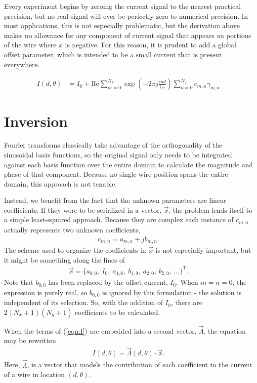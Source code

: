 \documentclass{article}
\def\real{\mathrm{Re}}
\begin{document}
Every experiment begins by zeroing the current signal to the nearest practical precision, but no real signal will ever be perfectly zero to numerical precision.  In most applications, this is not especially problematic, but the derivation above makes no allowance for any component of current signal that appears on portions of the wire where $x$ is negative.  For this reason, it is prudent to add a global offset parameter, which is intended to be a small current that is present everywhere.  

\begin{align}
I(d,\theta) &= I_0 + \real \sum_{m=0}^{N_x} \exp\left(-2\pi j \frac{md}{L_x} \right) \sum_{n=0}^{N_y} c_{m,n}\gamma_{m,n}\label{eqn:I}
\end{align}

\section{Inversion}

Fourier transforms classically take advantage of the orthogonality of the sinusoidal basis functions, so the original signal only needs to be integrated against each basis function over the entire domain to calculate the magnitude and phase of that component.  Because no single wire position spans the entire domain, this approach is not tenable.

Instead, we benefit from the fact that the unknown parameters are linear coefficients.  If they were to be serialized in a vector, $\vec{x}$, the problem lends itself to a simple least-squared approach.  Because they are complex each instance of $c_{m,n}$ actually represents two unknown coefficients,
\begin{align}
c_{m,n} = a_{m,n} + j b_{m,n}.
\end{align}
The scheme used to organize the coefficients in $\vec{x}$ is not especially important, but it might be something along the lines of 
\begin{align}
\vec{x} = \{a_{0,0},\ I_0,\ a_{1,0},\ b_{1,0},\ a_{2,0},\ b_{2,0},\ \ldots \}^T.
\end{align}
Note that $b_{0,0}$ has been replaced by the offset current, $I_0$.  When $m=n=0$, the expression is purely real, so $b_{0,0}$ is ignored by this formulation - the solution is independent of its selection.  So, with the addition of $I_0$, there are $2(N_x+1)(N_y+1)$ coefficients to be calculated.

When the terms of (\ref{eqn:I}) are embedded into a second vector, $\vec{\Lambda}$, the equation may be rewritten
\begin{align}
I(d,\theta) = \vec{\Lambda}(d,\theta) \cdot \vec{x}.
\end{align}
Here, $\vec{\Lambda}$, is a vector that models the contribution of each coefficient to the current of a wire in location $(d,\theta)$.
\end{document}

